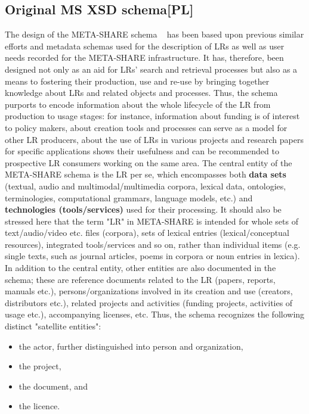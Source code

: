 \documentclass{llncs}
\begin{document}
\subsection{Original MS XSD schema[PL]}
\label{sec:xsd}
The design of the META-SHARE schema ~\cite{gavrilidou2012metashare} has been based upon previous similar efforts and metadata schemas used for the description of LRs as well as user needs recorded for the META-SHARE infrastructure. It has, therefore, been designed not only as an aid for LRs' search and retrieval processes but also as a means to fostering their production, use and re-use by bringing together knowledge about LRs and related objects and processes. Thus, the schema purports to encode information about the whole lifecycle of the LR from production to usage stages: for instance, information about funding is of interest to policy makers, about creation tools and processes can serve as a model for other LR producers, about the use of LRs in various projects and research papers for specific applications shows their usefulness and can be recommended to prospective LR consumers working on the same area.
The central entity of the META-SHARE schema is the LR per se, which encompasses both {\bf data sets} (textual, audio and multimodal/multimedia corpora, lexical data, ontologies, terminologies, computational grammars, language models, etc.) and {\bf technologies (tools/services)} used for their processing. It should also be stressed here that the term "LR" in META-SHARE is intended for whole sets of text/audio/video etc. files (corpora), sets of lexical entries (lexical/conceptual resources), integrated tools/services and so on, rather than individual items (e.g. single texts, such as journal articles, poems in corpora or noun entries in lexica).
In addition to the central entity, other entities are also documented in the schema; these are reference documents related to the LR (papers, reports, manuals etc.), persons/organizations involved in its creation and use (creators, distributors etc.), related projects and activities (funding projects, activities of usage etc.), accompanying licenses, etc. Thus, the schema recognizes the following distinct "satellite entities":
\begin{itemize}
\item the actor, further distinguished into person and organization,
\item the project,
\item the document, and
\item the licence.
\end{itemize}
\end{document}
